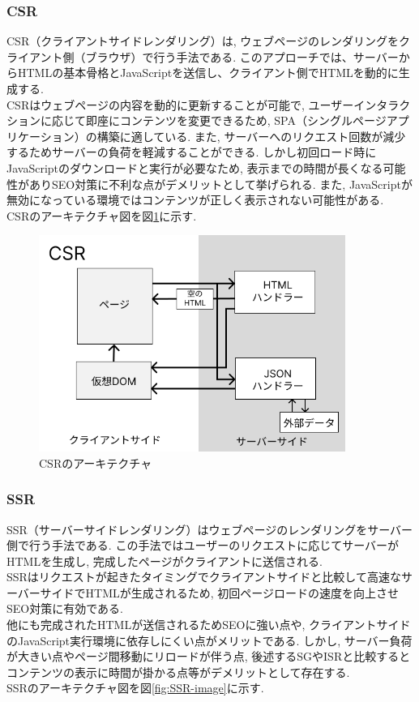 \subsubsection{CSR}
CSR（クライアントサイドレンダリング）は, ウェブページのレンダリングをクライアント側（ブラウザ）で行う手法である.
このアプローチでは、サーバーからHTMLの基本骨格とJavaScriptを送信し、クライアント側でHTMLを動的に生成する.\\
CSRはウェブページの内容を動的に更新することが可能で, ユーザーインタラクションに応じて即座にコンテンツを変更できるため, SPA（シングルページアプリケーション）の構築に適している. また, サーバーへのリクエスト回数が減少するためサーバーの負荷を軽減することができる.
しかし初回ロード時にJavaScriptのダウンロードと実行が必要なため, 表示までの時間が長くなる可能性がありSEO対策に不利な点がデメリットとして挙げられる. また, JavaScriptが無効になっている環境ではコンテンツが正しく表示されない可能性がある.\\
CSRのアーキテクチャ図を図\ref{fig:CSR-image}に示す.

\begin{figure}[htbp]
	\begin{center}
		\includegraphics[width=100mm]{./images/CSR.png}
		\caption{CSRのアーキテクチャ}\label{fig:CSR-image}
	\end{center}
\end{figure}

\subsubsection{SSR}
SSR（サーバーサイドレンダリング）はウェブページのレンダリングをサーバー側で行う手法である.
この手法ではユーザーのリクエストに応じてサーバーがHTMLを生成し, 完成したページがクライアントに送信される. \\
SSRはリクエストが起きたタイミングでクライアントサイドと比較して高速なサーバーサイドでHTMLが生成されるため, 初回ページロードの速度を向上させSEO対策に有効である.\\
他にも完成されたHTMLが送信されるためSEOに強い点や, クライアントサイドのJavaScript実行環境に依存しにくい点がメリットである.
しかし, サーバー負荷が大きい点やページ間移動にリロードが伴う点, 後述するSGやISRと比較するとコンテンツの表示に時間が掛かる点等がデメリットとして存在する.\\
SSRのアーキテクチャ図を図\ref{fig:SSR-image}に示す.

